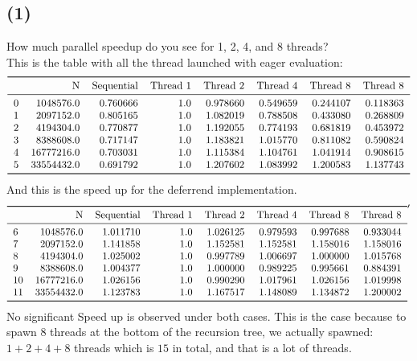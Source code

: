 \documentclass[]{article}
\begin{document}
    \subsection*{(1)}
        How much parallel speedup do you see for 1, 2, 4, and 8 threads?
        \\[1.1em]
        This is the table with all the thread launched with eager evaluation:
        $$
        \begin{tabular}{lrrrrrrr}
            \toprule
            {} &          N &Sequential &Thread  1 &Thread   2 &Thread   4 &Thread   8 &Thread  8 \\
            \midrule
            0  &   1048576.0 &  0.760666 &  1.0 &  0.978660 &  0.549659 &  0.244107 &  0.118363 \\
            1  &   2097152.0 &  0.805165 &  1.0 &  1.082019 &  0.788508 &  0.433080 &  0.268809 \\
            2  &   4194304.0 &  0.770877 &  1.0 &  1.192055 &  0.774193 &  0.681819 &  0.453972 \\
            3  &   8388608.0 &  0.717147 &  1.0 &  1.183821 &  1.015770 &  0.811082 &  0.590824 \\
            4  &  16777216.0 &  0.703031 &  1.0 &  1.115384 &  1.104761 &  1.041914 &  0.908615 \\
            5  &  33554432.0 &  0.691792 &  1.0 &  1.207602 &  1.083992 &  1.200583 &  1.137743 \\
            \bottomrule
            \end{tabular}
        $$
        And this is the speed up for the deferrend implementation. 
        $$
        \begin{tabular}{lrrrrrrr}
            \toprule
            {} &          N &Sequential &Thread  1 &Thread   2 &Thread   4 &Thread   8 &Thread  8 \\
            \midrule
            6  &   1048576.0 &  1.011710 &  1.0 &  1.026125 &  0.979593 &  0.997688 &  0.933044 \\
            7  &   2097152.0 &  1.141858 &  1.0 &  1.152581 &  1.152581 &  1.158016 &  1.158016 \\
            8  &   4194304.0 &  1.025002 &  1.0 &  0.997789 &  1.006697 &  1.000000 &  1.015768 \\
            9  &   8388608.0 &  1.004377 &  1.0 &  1.000000 &  0.989225 &  0.995661 &  0.884391 \\
            10 &  16777216.0 &  1.026156 &  1.0 &  0.990290 &  1.017961 &  1.026156 &  1.019998 \\
            11 &  33554432.0 &  1.123783 &  1.0 &  1.167517 &  1.148089 &  1.134872 &  1.200002 \\
            \bottomrule
        \end{tabular}'
        $$
        No significant Speed up is observed under both cases. This is the case because to spawn 8 threads at the bottom of the recursion tree, we actually spawned: $1 + 2 + 4 + 8$ threads which is $15$ in total, and that is a lot of threads. 
\end{document}
